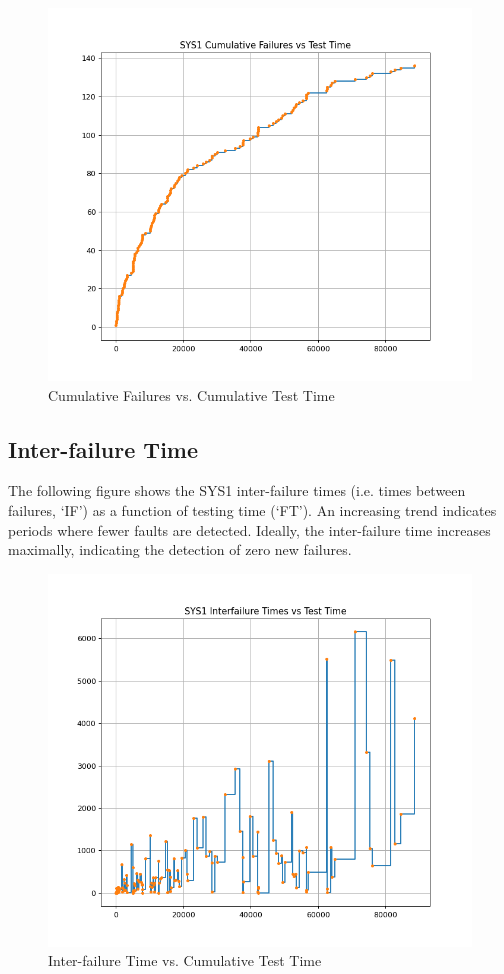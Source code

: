 \documentclass{article}
\begin{document}
\begin{figure}[h!]
\centering
\includegraphics[width=\textwidth]{cfplot1.png}
\caption{Cumulative Failures vs. Cumulative Test Time}
\label{fig:cfplot}
\end{figure}



\newpage
\subsection{Inter-failure Time}
The following figure shows the SYS1 inter-failure times (i.e. times between failures, `IF') as a function of testing time (`FT'). An increasing trend indicates periods where fewer faults are detected. Ideally, the inter-failure time increases maximally, indicating the detection of zero new failures.

\begin{figure}[h!]
\centering
\includegraphics[width=\textwidth]{ifplot1.png}
\caption{Inter-failure Time vs. Cumulative Test Time}
\label{fig:ifplot}
\end{figure}
\end{document}
